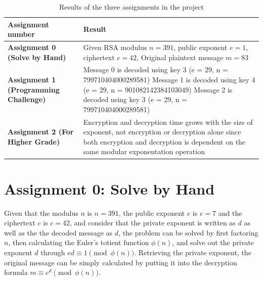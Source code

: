 \documentclass[11pt,a4paper]{article}
\begin{document}
\begin{table}[htbp]
\centering
\caption{Results of the three assignments in the project}
\begin{tabular}{@{}>{\bfseries}p{} p{}@{}}
\toprule
\textnormal{\textbf{Assignment number}} & \textbf{Result} \\ 
\midrule
Assignment 0 \newline (Solve by Hand) & Given RSA modulus $n=391$, public exponent $e=1$, ciphertext $c=42$, \newline Original plaintext message $m=83$ \\ \addlinespace
Assignment 1 \newline (Programming Challenge) & Message 0 is decoded using key 3 \newline (e = 29, n = 799710404000289581) \newline Message 1 is decoded using key 4 \newline (e = 29, n = 901082142384103049) \newline Message 2 is decoded using key 3 \newline (e = 29, n = 799710404000289581) \\ \addlinespace
Assignment 2 \newline (For Higher Grade) & Encryption and decryption time grows with the size of exponent, not encryption or decryption alone since both encryption and decryption is dependent on the same modular exponentation operation \\
\bottomrule
\end{tabular}

\label{tab:result_summary}
\end{table}

\section*{Assignment 0: Solve by Hand}

Given that the modulus $n$ is $n=391$, the public exponent $e$ is $e=7$ and the ciphertext $c$ is $c=42$, and consider that the private exponent is written as $d$ as well as the the decoded message as $d$, the problem can be solved by first factoring $n$, then calculating the Euler's totient function $\phi(n)$, and solve out the private exponent $d$ through $ed \equiv 1 \pmod{\phi(n)}$. Retrieving the private exponent, the original message can be simply calculated by putting it into the decryption formula $m \equiv c^d \pmod{\phi(n)}$.
\end{document}
